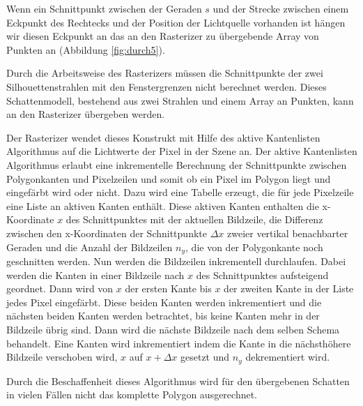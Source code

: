 Wenn ein Schnittpunkt zwischen der Geraden $s$ und der Strecke zwischen einem Eckpunkt des Rechtecks
und der Position der Lichtquelle vorhanden ist hängen wir diesen Eckpunkt an das an den Rasterizer
zu übergebende Array von Punkten an (Abbildung \ref{fig:durch5}).

Durch die Arbeitsweise des Rasterizers müssen die Schnittpunkte der zwei Silhouettenstrahlen mit den
Fenstergrenzen nicht berechnet werden. Dieses Schattenmodell, bestehend aus zwei Strahlen und einem
Array an Punkten, kann an den Rasterizer übergeben werden.

Der Rasterizer wendet dieses Konstrukt mit Hilfe des aktive Kantenlisten Algorithmus auf die
Lichtwerte der Pixel in der Szene an. Der aktive Kantenlisten Algorithmus erlaubt eine inkrementelle
Berechnung der Schnittpunkte zwischen Polygonkanten und Pixelzeilen und somit ob ein Pixel
im Polygon liegt und eingefärbt wird oder nicht. Dazu wird eine Tabelle erzeugt, die für jede Pixelzeile eine Liste an aktiven Kanten
enthält. Diese aktiven Kanten enthalten die x-Koordinate $x$ des Schnittpunktes mit der aktuellen Bildzeile, die
Differenz zwischen den x-Koordinaten der Schnittpunkte $\Delta x$ zweier vertikal benachbarter
Geraden und die Anzahl der Bildzeilen $n_y$, die von der Polygonkante noch geschnitten werden. Nun
werden die Bildzeilen inkrementell durchlaufen. Dabei werden die Kanten in einer Bildzeile nach $x$
des Schnittpunktes aufsteigend geordnet. Dann wird von $x$ der ersten Kante bis $x$ der zweiten Kante in der Liste
jedes Pixel eingefärbt. Diese beiden Kanten werden inkrementiert und die nächsten beiden Kanten werden
betrachtet, bis keine Kanten mehr in der Bildzeile übrig sind. Dann wird die nächste Bildzeile
nach dem selben Schema behandelt. Eine Kanten wird inkrementiert indem die Kante in die nächsthöhere Bildzeile verschoben
wird, $x$ auf $x + \Delta x$ gesetzt und $n_y$ dekrementiert wird.


Durch die Beschaffenheit dieses Algorithmus wird für den übergebenen Schatten in vielen Fällen nicht das komplette Polygon ausgerechnet.
